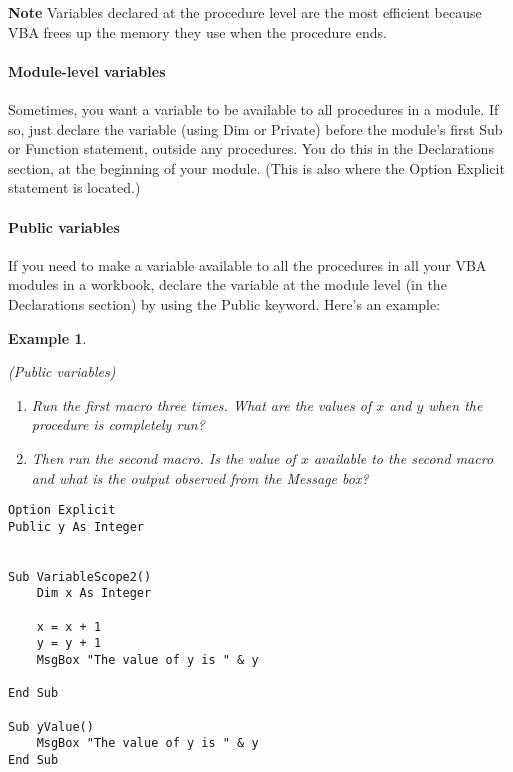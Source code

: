 \documentclass[
]{article}
\theoremstyle{definition}
\theoremstyle{definition}
\newtheorem{example}{Example}[section]
\theoremstyle{definition}
\theoremstyle{definition}
\theoremstyle{remark}
\begin{document}
\textbf{Note} Variables declared at the procedure level are the most
efficient because VBA frees up the memory they use when the procedure
ends.

\hypertarget{module-level-variables}{%
\paragraph{Module-level variables}\label{module-level-variables}}

Sometimes, you want a variable to be available to all procedures in a
module. If so, just declare the variable (using Dim or Private) before
the module's first Sub or Function statement, outside any procedures.
You do this in the Declarations section, at the beginning of your
module. (This is also where the Option Explicit statement is located.)

\hypertarget{public-variables}{%
\paragraph{Public variables}\label{public-variables}}

If you need to make a variable available to all the procedures in all your VBA modules in a workbook, declare the variable at the module level
(in the Declarations section) by using the Public keyword. Here's an
example:

\begin{example}
\protect\hypertarget{exm:unlabeled-div-26}{}\label{exm:unlabeled-div-26}

\emph{(Public variables)}

\begin{enumerate}
\def\labelenumi{\arabic{enumi}.}
\item
  \emph{Run the first macro three times. What are the values of \(x\) and \(y\)
  when the procedure is completely run?}
\item
  \emph{Then run the second macro. Is the value of \(x\) available to the
  second macro and what is the output observed from the Message box?}
\end{enumerate}

\end{example}

\begin{verbatim}
Option Explicit
Public y As Integer


Sub VariableScope2()
    Dim x As Integer

    x = x + 1
    y = y + 1
    MsgBox "The value of y is " & y

End Sub

Sub yValue()
    MsgBox "The value of y is " & y
End Sub
\end{verbatim}
\end{document}
